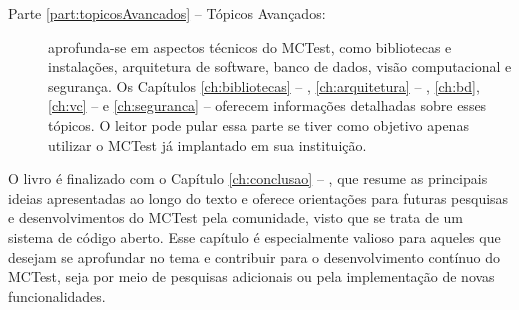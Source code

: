 \begin{description}
\item[Parte \ref{part:topicosAvancados} -- Tópicos Avançados:] aprofunda-se em aspectos técnicos do MCTest, como bibliotecas e instalações, arquitetura de software, banco de dados, visão computacional e segurança. Os Capítulos \ref{ch:bibliotecas} -- , \ref{ch:arquitetura} -- , \ref{ch:bd}, \ref{ch:vc} --  e \ref{ch:seguranca} --  oferecem informações detalhadas sobre esses tópicos. O leitor pode pular essa parte se tiver como objetivo apenas utilizar o MCTest já implantado em sua instituição.

\end{description}

O livro é finalizado com o Capítulo \ref{ch:conclusao} -- , que resume as principais ideias apresentadas ao longo do texto e oferece orientações para futuras pesquisas e desenvolvimentos do MCTest pela comunidade, visto que se trata de um sistema de código aberto. Esse capítulo é especialmente valioso para aqueles que desejam se aprofundar no tema e contribuir para o desenvolvimento contínuo do MCTest, seja por meio de pesquisas adicionais ou pela implementação de novas funcionalidades.
